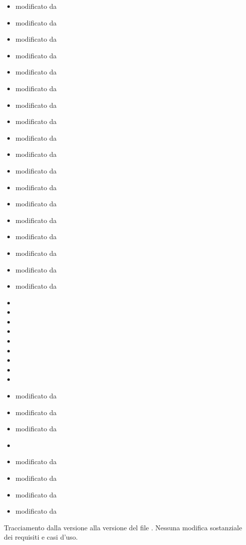 \begin{itemize}
	\item {} modificato da 
	\item {} modificato da 
	\item {} modificato da 
	\item {} modificato da 
	\item {} modificato da 
	\item {} modificato da 
	\item {} modificato da 
	\item {} modificato da 
	\item {} modificato da 
	\item {} modificato da 
	\item {} modificato da 
	\item {} modificato da 
	\item {} modificato da 
	\item {} modificato da 
	\item {} modificato da 
	\item {} modificato da 
	\item {} modificato da 
	\item {} modificato da 
	\item {} 
	\item {} 
	\item {} 
	\item {} 
	\item {} 
	\item {} 
	\item {} 
	\item {} 
	\item {} 
	\item {} modificato da  
	\item {} modificato da  
	\item {} modificato da  
	\item {} 
	\item {} modificato da  
	\item {} modificato da  
	\item {} modificato da  
	\item {} modificato da  
\end{itemize}

Tracciamento dalla versione  alla versione  del file .
\newline
\newline
Nessuna modifica sostanziale dei requisiti e casi d'uso.



